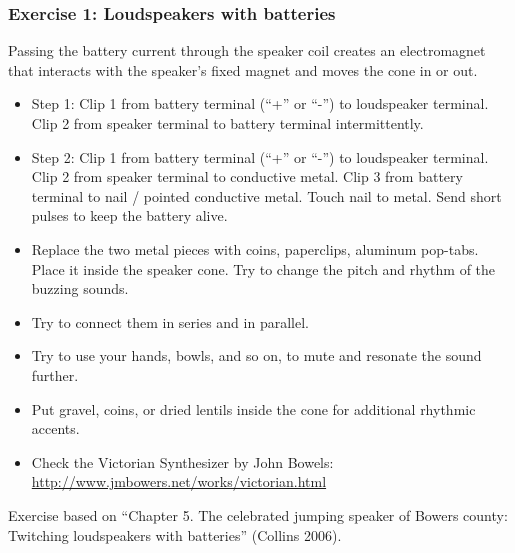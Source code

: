 \documentclass[screen, aspectratio=43]{beamer}
\begin{document}
\begin{frame}
  \frametitle{Exercise 1: Loudspeakers with batteries}
 {\scriptsize 
 Passing the battery current through the speaker coil creates an electromagnet that interacts with the speaker's fixed magnet and moves the cone in or out.
   \begin{itemize}
	\item Step 1: Clip 1 from battery terminal (``+'' or ``-'') to loudspeaker terminal. Clip 2 from speaker terminal to battery terminal intermittently.
	\item Step 2: Clip 1 from battery terminal (``+'' or ``-'') to loudspeaker terminal. Clip 2 from speaker terminal to conductive metal. Clip 3 from battery terminal to nail / pointed conductive metal. Touch nail to metal. Send short pulses to keep the battery alive.
	\item Replace the two metal pieces with coins, paperclips, aluminum pop-tabs. Place it inside the speaker cone. Try to change the pitch and rhythm of the buzzing sounds.
	\item Try to connect them in series and in parallel.
	\item Try to use your hands, bowls, and so on, to mute and resonate the sound further. 
	\item Put gravel, coins, or dried lentils inside the cone for additional rhythmic accents. 
	\item Check the Victorian Synthesizer by John Bowels: \url{http://www.jmbowers.net/works/victorian.html}
    \end{itemize}   
}    
{\tiny
Exercise based on ``Chapter 5. The celebrated jumping speaker of Bowers county: Twitching loudspeakers with batteries'' (Collins 2006).
}
\end{frame}
%
\end{document}
